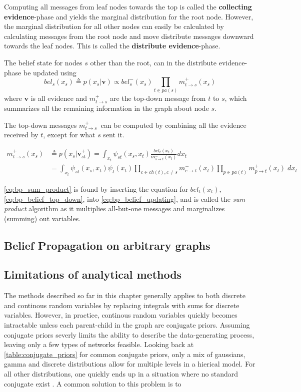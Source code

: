 Computing all messages from leaf nodes towards the top is called the \textbf{collecting evidence}-phase and yields the marginal distribution for the root node. However, the marginal distribution for all other nodes can easily be calculated by calculating messages from the root node and move distribute messages downward towards the leaf nodes. This is called the \textbf{distribute evidence}-phase. 

The belief state for nodes $s$ other than the root, can in the distribute evidence-phase be updated using
\begin{equation}\label{eq:bp_belief_top_down}
    bel_s(x_s) \triangleq p(x_s | \mathbf{v}) \propto bel_s^-(x_s) \prod_{t \in pa(s)} m_{t \to s}^+(x_s)
\end{equation}
where $\mathbf{v}$ is all evidence and $m_{t \to s}^+$ are the top-down message from $t$ to $s$, which summarizes all the remaining information in the graph about node $s$. 

The top-down messages $m_{t \to s}^+$ can be computed by combining all the evidence received by $t$, except for what $s$ sent it.

\begin{subequations}
\begin{align}
    m_{t \to s}^+(x_s) &\triangleq p(x_s | \mathbf{v}_{st}^+) = \int_{x_t}\psi_{st}(x_s, x_t)\frac{bel_t(x_t)}{m_{s \to t}^-(x_t)}dx_t \label{eq:bp_belief_updating}\\
    &= \int_{x_t} \psi_{st}(x_s, x_t)\psi_t(x_t) \prod_{c \in ch(t), c \neq s} m_{c \to t}^-(x_t) \prod_{p \in pa(t)} m_{p \to t}^+(x_t) \; dx_t\label{eq:bp_sum_product}
\end{align}
\end{subequations}

\cref{eq:bp_sum_product} is found by inserting the equation for $bel_t(x_t)$, \cref{eq:bp_belief_top_down}, into \cref{eq:bp_belief_updating}, and is called the \textit{sum-product} algorithm as it multiplies all-but-one messages and marginalizes (summing) out variables. 

\subsection{Belief Propagation on arbitrary graphs}


\subsection{Limitations of analytical methods}
The methods described so far in this chapter generally applies to both discrete and continous random variables by replacing integrals with sums for discrete variables. However, in practice, continous random variables quickly becomes intractable unless each parent-child in the graph are conjugate priors. Assuming conjugate priors severly limits the ability to describe the data-generating process, leaving only a few types of networks feasible. Looking back at \cref{table:conjugate_priors} for common conjugate priors, only a mix of gaussians, gamma and discrete distributions allow for multiple levels in a hierical model. For all other distributions, one quickly ends up in a situation where no standard conjugate exist \cite{winnbishop}. A common solution to this problem is to 
